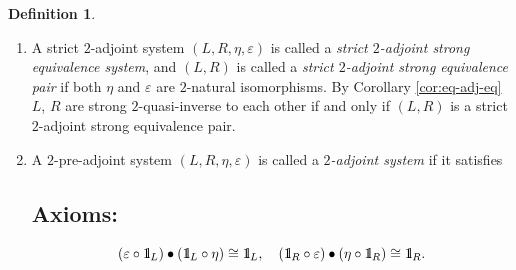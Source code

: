 \documentclass{surv-l}
\makeatletter
\numberwithin{equation}{chapter}
\numberwithin{figure}{chapter}
\theoremstyle{plain}
\theoremstyle{definition}
\newtheorem{dfn}[thm]{Definition}
\theoremstyle{remark}
\newcommand{\id}{1\kern-.25em{\text{{\rm l}}}}
\newcommand{\adj}{\xymatrix@1@C=10pt{\ar@{-|}[r]&}\,}
\makeatother
\begin{document}
\begin{dfn}
\begin{enumerate}
\subsection*{Axioms:}
The following diagrams are commutative:
\begin{equation*}
\xymatrix@C=50pt{
L & L\circ R \circ L & R & R \circ L \circ R\\
   & L &   & R
\ar@{=>}"1,1";"1,2"^{\id_L \circ \eta}
\ar@{=>}"1,3";"1,4"^{\eta \circ \id_R}
\ar@{=>}"1,2";"2,2"^{\varepsilon \circ \id_L}
\ar@{=>}"1,4";"2,4"^{\id_R \circ \varepsilon}
\ar@{=}"1,1";"2,2"
\ar@{=}"1,3";"2,4"
}
\end{equation*}
in other words, the satsify the zigzag equations \eqref{eq:zigzag}.
Then $L$ is called a \emph{left $2$-adjoint} to $R$,
$R$ is called a \emph{right $2$-adjoint} to $L$, and we denote it by
$L \adj R$.
$2$-natural transformations $\eta, \varepsilon$ are called
\emph{2-unit}, \emph{2-counit} of this strict $2$-adjoint system, respectively.
\item A strict $2$-adjoint system $(L, R, \eta, \varepsilon)$ is called
a \emph{strict $2$-adjoint strong equivalence system}, and
$(L, R)$ is called a \emph{strict $2$-adjoint strong equivalence pair}
if both $\eta$ and $\varepsilon$ are $2$-natural isomorphisms.
By Corollary \ref{cor:eq-adj-eq} $L$, $R$ are strong $2$-quasi-inverse
to each other if and only if $(L, R)$ is a strict $2$-adjoint strong equivalence pair.
\item A $2$-pre-adjoint system $(L, R, \eta, \varepsilon)$ is called
a \emph{$2$-adjoint system} if it satisfies

\subsection*{Axioms:}
\begin{equation*}
(\varepsilon \circ \id_L) \bullet (\id_L \circ \eta) \cong \id_L,\quad
(\id_R \circ \varepsilon) \bullet (\eta \circ \id_R) \cong \id_R.
\end{equation*}
\end{enumerate}
\end{dfn}
\end{document}
